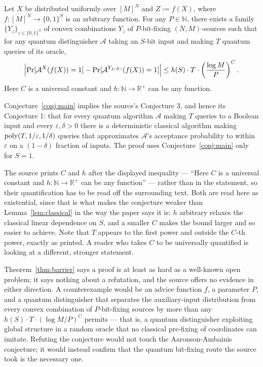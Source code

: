 \documentclass{aicr-conjecture}
\newcommand{\Adv}{\mathcal{A}}
\newcommand{\Prb}{\Pr}
\newcommand{\bits}{\{0,1\}}
\begin{document}
\begin{conjecture}\label{conj:main}
Let $X$ be distributed uniformly over $[M]^{N}$ and $Z := f(X)$, where
$f : [M]^{N} \to \bits^{S}$ is an arbitrary function. For any $P \in
\mathbb{N}$, there exists a family $\{Y_{z}\}_{z \in \bits^{S}}$ of
convex combinations $Y_{z}$ of $P$-bit-fixing $(N,M)$-sources such that
for any quantum distinguisher $\Adv$ taking an $S$-bit input and making
$T$ quantum queries of its oracle,
\[
  \Bigl|\Prb[\Adv^{X}(f(X)) = 1]
  - \Prb[\Adv^{Y_{f(X)}}(f(X)) = 1]\Bigr|
  \le h(S) \cdot T \cdot \left(\frac{\log M}{P}\right)^{C}.
\]
Here $C$ is a universal constant and $h : \mathbb{N} \to \mathbb{R}^{+}$
can be any function.
\end{conjecture}

\begin{theorem}\label{thm:barrier}
Conjecture~\ref{conj:main} implies the source's Conjecture 3, and hence
its Conjecture 1: that for every quantum algorithm $\Adv$ making $T$
queries to a Boolean input and every $\varepsilon, \delta > 0$ there is
a deterministic classical algorithm making $\mathrm{poly}(T, 1/\varepsilon,
1/\delta)$ queries that approximates $\Adv$'s acceptance probability to
within $\varepsilon$ on a $(1-\delta)$ fraction of inputs. The proof
uses Conjecture~\ref{conj:main} only for $S = 1$.
\end{theorem}

\begin{remark}\label{rem:quantifiers}
The source prints $C$ and $h$ after the displayed inequality --- ``Here
$C$ is a universal constant and $h : \mathbb{N} \to \mathbb{R}^{+}$ can
be any function'' --- rather than in the statement, so their
quantification has to be read off the surrounding text. Both are read
here as existential, since that is what makes the conjecture weaker
than Lemma~\ref{lem:classical} in the way the paper says it is: $h$
arbitrary relaxes the classical linear dependence on $S$, and a smaller
$C$ makes the bound larger and so easier to achieve. Note that $T$
appears to the first power and outside the $C$-th power, exactly as
printed. A reader who takes $C$ to be universally quantified is looking
at a different, stronger statement.
\end{remark}

\begin{remark}\label{rem:refutation}
Theorem~\ref{thm:barrier} says a proof is at least as hard as a
well-known open problem; it says nothing about a refutation, and the
source offers no evidence in either direction. A counterexample would be
an advice function $f$, a parameter $P$, and a quantum distinguisher
that separates the auxiliary-input distribution from every convex
combination of $P$-bit-fixing sources by more than any $h(S) \cdot T
\cdot (\log M / P)^{C}$ permits --- that is, a quantum distinguisher
exploiting global structure in a random oracle that no classical
pre-fixing of coordinates can imitate. Refuting the conjecture would
not touch the Aaronson-Ambainis conjecture; it would instead confirm
that the quantum bit-fixing route the source took is the necessary one.
\end{remark}
\end{document}
